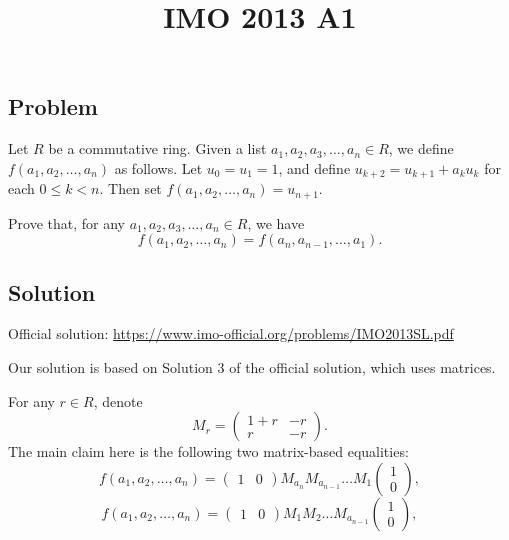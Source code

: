\documentclass{article}
\title{IMO 2013 A1}
\author{}
\date{}
\begin{document}
\maketitle



\subsection*{Problem}

Let $R$ be a commutative ring.
Given a list $a_1, a_2, a_3, \ldots, a_n \in R$, we define $f(a_1, a_2, \ldots, a_n)$ as follows.
Let $u_0 = u_1 = 1$, and define $u_{k + 2} = u_{k + 1} + a_k u_k$ for each $0 \leq k < n$.
Then set $f(a_1, a_2, \ldots, a_n) = u_{n + 1}$.

Prove that, for any $a_1, a_2, a_3, \ldots, a_n \in R$, we have
\[ f(a_1, a_2, \ldots, a_n) = f(a_n, a_{n - 1}, \ldots, a_1). \]



\subsection*{Solution}

Official solution: \url{https://www.imo-official.org/problems/IMO2013SL.pdf}

Our solution is based on Solution 3 of the official solution, which uses matrices.

For any $r \in R$, denote
\[ M_r = \begin{pmatrix} 1 + r & -r \\ r & -r \end{pmatrix}. \]
The main claim here is the following two matrix-based equalities:
\[ f(a_1, a_2, \ldots, a_n) = \begin{pmatrix} 1 & 0 \end{pmatrix} M_{a_n} M_{a_{n - 1}} \ldots M_1 \begin{pmatrix} 1 \\ 0 \end{pmatrix}, \]
\[ f(a_1, a_2, \ldots, a_n) = \begin{pmatrix} 1 & 0 \end{pmatrix} M_1 M_2 \ldots M_{a_{n - 1}} \begin{pmatrix} 1 \\ 0 \end{pmatrix}, \]
\end{document}
